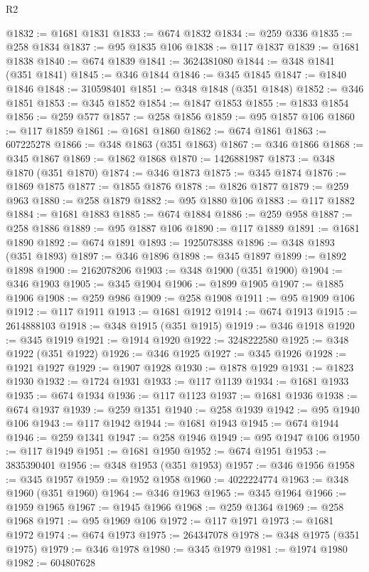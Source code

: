 \begin{lexlean}{R2}
\begin{coremodule}
@1832 := @1681 @1831
@1833 := @674 @1832
@1834 := @259 @336
@1835 := @258 @1834
@1837 := @95 @1835 @106
@1838 := @117 @1837
@1839 := @1681 @1838
@1840 := @674 @1839
@1841 := 3624381080
@1844 := @348 @1841 (@351 @1841)
@1845 := @346 @1844
@1846 := @345 @1845
@1847 := @1840 @1846
@1848 := 310598401
@1851 := @348 @1848 (@351 @1848)
@1852 := @346 @1851
@1853 := @345 @1852
@1854 := @1847 @1853
@1855 := @1833 @1854
@1856 := @259 @577
@1857 := @258 @1856
@1859 := @95 @1857 @106
@1860 := @117 @1859
@1861 := @1681 @1860
@1862 := @674 @1861
@1863 := 607225278
@1866 := @348 @1863 (@351 @1863)
@1867 := @346 @1866
@1868 := @345 @1867
@1869 := @1862 @1868
@1870 := 1426881987
@1873 := @348 @1870 (@351 @1870)
@1874 := @346 @1873
@1875 := @345 @1874
@1876 := @1869 @1875
@1877 := @1855 @1876
@1878 := @1826 @1877
@1879 := @259 @963
@1880 := @258 @1879
@1882 := @95 @1880 @106
@1883 := @117 @1882
@1884 := @1681 @1883
@1885 := @674 @1884
@1886 := @259 @958
@1887 := @258 @1886
@1889 := @95 @1887 @106
@1890 := @117 @1889
@1891 := @1681 @1890
@1892 := @674 @1891
@1893 := 1925078388
@1896 := @348 @1893 (@351 @1893)
@1897 := @346 @1896
@1898 := @345 @1897
@1899 := @1892 @1898
@1900 := 2162078206
@1903 := @348 @1900 (@351 @1900)
@1904 := @346 @1903
@1905 := @345 @1904
@1906 := @1899 @1905
@1907 := @1885 @1906
@1908 := @259 @986
@1909 := @258 @1908
@1911 := @95 @1909 @106
@1912 := @117 @1911
@1913 := @1681 @1912
@1914 := @674 @1913
@1915 := 2614888103
@1918 := @348 @1915 (@351 @1915)
@1919 := @346 @1918
@1920 := @345 @1919
@1921 := @1914 @1920
@1922 := 3248222580
@1925 := @348 @1922 (@351 @1922)
@1926 := @346 @1925
@1927 := @345 @1926
@1928 := @1921 @1927
@1929 := @1907 @1928
@1930 := @1878 @1929
@1931 := @1823 @1930
@1932 := @1724 @1931
@1933 := @117 @1139
@1934 := @1681 @1933
@1935 := @674 @1934
@1936 := @117 @1123
@1937 := @1681 @1936
@1938 := @674 @1937
@1939 := @259 @1351
@1940 := @258 @1939
@1942 := @95 @1940 @106
@1943 := @117 @1942
@1944 := @1681 @1943
@1945 := @674 @1944
@1946 := @259 @1341
@1947 := @258 @1946
@1949 := @95 @1947 @106
@1950 := @117 @1949
@1951 := @1681 @1950
@1952 := @674 @1951
@1953 := 3835390401
@1956 := @348 @1953 (@351 @1953)
@1957 := @346 @1956
@1958 := @345 @1957
@1959 := @1952 @1958
@1960 := 4022224774
@1963 := @348 @1960 (@351 @1960)
@1964 := @346 @1963
@1965 := @345 @1964
@1966 := @1959 @1965
@1967 := @1945 @1966
@1968 := @259 @1364
@1969 := @258 @1968
@1971 := @95 @1969 @106
@1972 := @117 @1971
@1973 := @1681 @1972
@1974 := @674 @1973
@1975 := 264347078
@1978 := @348 @1975 (@351 @1975)
@1979 := @346 @1978
@1980 := @345 @1979
@1981 := @1974 @1980
@1982 := 604807628

\end{coremodule}
\end{lexlean}
